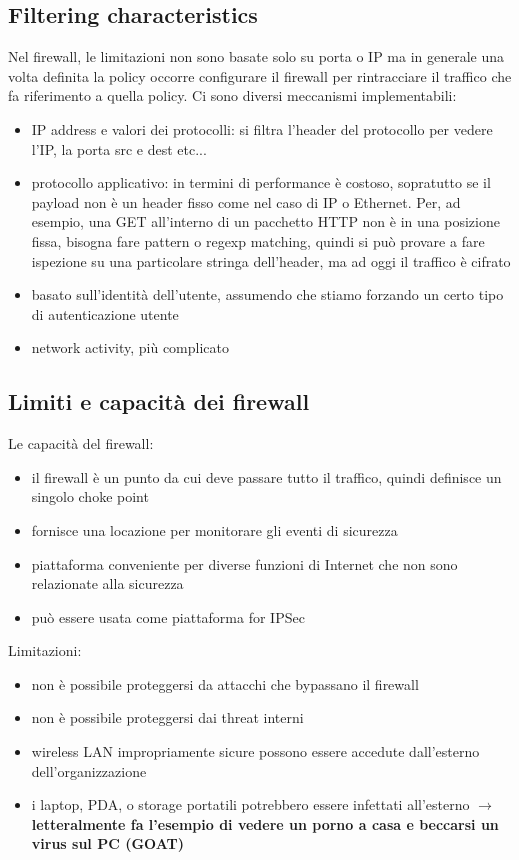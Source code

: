 \documentclass[12pt, oneside]{extbook} %
\begin{document}
\subsection{Filtering characteristics}
Nel firewall, le limitazioni non sono basate solo su porta o IP ma in generale una volta definita la policy occorre configurare il firewall per rintracciare il traffico che fa riferimento a quella policy. Ci sono diversi meccanismi implementabili:
\begin{itemize}
\item IP address e valori dei protocolli: si filtra l'header del protocollo per vedere l'IP, la porta src e dest etc...
\item protocollo applicativo: in termini di performance è costoso, sopratutto se il payload non è un header fisso come nel caso di IP o Ethernet. Per, ad esempio, una GET all'interno di un pacchetto HTTP non è in una posizione fissa, bisogna fare pattern o regexp matching, quindi si può provare a fare ispezione su una particolare stringa dell'header, ma ad oggi il traffico è cifrato
\item basato sull'identità dell'utente, assumendo che stiamo forzando un certo tipo di autenticazione utente
\item network activity, più complicato
\end{itemize}
\subsection{Limiti e capacità dei firewall}
Le capacità del firewall:
\begin{itemize}
\item il firewall è un punto da cui deve passare tutto il traffico, quindi definisce un singolo choke point 
\item fornisce una locazione per monitorare gli eventi di sicurezza
\item piattaforma conveniente per diverse funzioni di Internet che non sono relazionate alla sicurezza
\item può essere usata come piattaforma for IPSec
\end{itemize}
Limitazioni:
\begin{itemize}
\item non è possibile proteggersi da attacchi che bypassano il firewall
\item non è possibile proteggersi dai threat interni
\item wireless LAN impropriamente sicure possono essere accedute dall'esterno dell'organizzazione
\item i laptop, PDA, o storage portatili potrebbero essere infettati all'esterno $\rightarrow$ \textbf{letteralmente fa l'esempio di vedere un porno a casa e beccarsi un virus sul PC (GOAT)}
\end{itemize}
\end{document}
